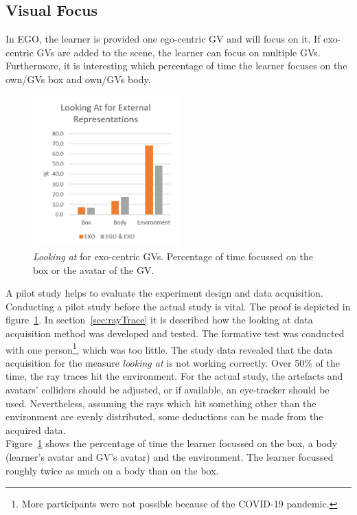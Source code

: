 \subsection{Visual Focus}
In EGO, the learner is provided one ego-centric GV and will focus on it. If exo-centric GVs are added to the scene, the learner can focus on multiple GVs. Furthermore, it is interesting which percentage of time the learner focuses on the own/GVs box and own/GVs body.\\
\begin{figure}[htb]
	\centering
	\includegraphics[width=0.5\textwidth]{figures/lookingAtExternalRepresentations.png}
	\caption[\textit{Looking at} for exo-centric guidance visualisations]{\textit{Looking at} for exo-centric GVs. Percentage of time focussed on the box or the avatar of the GV.}
	\label{fig:lookingAtExternal}
\end{figure}
A pilot study helps to evaluate the experiment design and data acquisition. Conducting a pilot study before the actual study is vital. The proof is depicted in figure~\ref{fig:lookingAtExternal}. In section~\ref{sec:rayTrace} it is described how the looking at data acquisition method was developed and tested. The formative test was conducted with one person\footnote{More participants were not possible because of the COVID-19 pandemic.}, which was too little. The study data revealed that the data acquisition for the measure \textit{looking at} is not working correctly. Over 50\% of the time, the ray traces hit the environment. For the actual study, the artefacts and avatars' colliders should be adjusted, or if available, an eye-tracker should be used. Nevertheless, assuming the rays which hit something other than the environment are evenly distributed, some deductions can be made from the acquired data.\\
Figure~\ref{fig:lookingAtExternal} shows the percentage of time the learner focussed on the box, a body (learner's avatar and GV's avatar) and the environment. The learner focussed roughly twice as much on a body than on the box.\\
